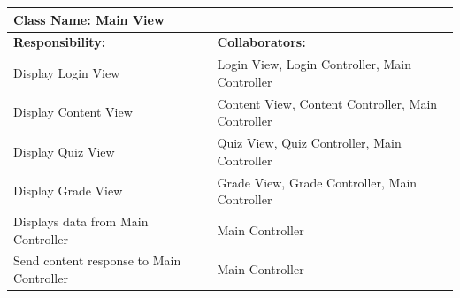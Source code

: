 \documentclass[]{article}
\begin{document}
	\begin{table}[H]
	\centering
		\begin{tabular}{|p{9cm}|p{3cm}|}
		\hline
		 \multicolumn{2}{|l|}{\textbf{Class Name: Main View}} \\
		\hline
		\textbf{Responsibility:} & \textbf{Collaborators:} \\
		\hline
	    Display Login View & Login View, Login Controller, Main Controller\\
		\hline
		Display Content View & Content View, Content Controller, Main Controller 	\\
		\hline
		Display Quiz View & Quiz View, Quiz Controller, Main Controller\\
		\hline
		Display Grade View & Grade View, Grade Controller, Main Controller\\
		\hline 
		Displays data from Main Controller & Main Controller\\
		\hline
		Send content response to Main Controller & Main Controller\\
		\hline
		\end{tabular}
	\end{table}	
	
\end{document}
